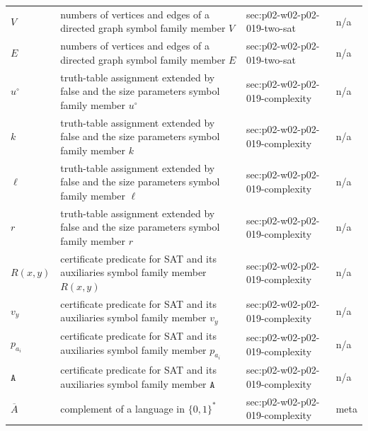 \begin{longtable}{@{}p{}p{}p{}p{}@{}}
\(V\) & numbers of vertices and edges of a directed graph symbol family member \(V\) & sec:\allowbreak{}p02-\allowbreak{}w02-\allowbreak{}p02-\allowbreak{}019-\allowbreak{}two-\allowbreak{}sat & n/a \\
\(E\) & numbers of vertices and edges of a directed graph symbol family member \(E\) & sec:\allowbreak{}p02-\allowbreak{}w02-\allowbreak{}p02-\allowbreak{}019-\allowbreak{}two-\allowbreak{}sat & n/a \\
\(u^{\circ}\) & truth-table assignment extended by false and the size parameters symbol family member \(u^{\circ}\) & sec:\allowbreak{}p02-\allowbreak{}w02-\allowbreak{}p02-\allowbreak{}019-\allowbreak{}complexity & n/a \\
\(k\) & truth-table assignment extended by false and the size parameters symbol family member \(k\) & sec:\allowbreak{}p02-\allowbreak{}w02-\allowbreak{}p02-\allowbreak{}019-\allowbreak{}complexity & n/a \\
\(\ell\) & truth-table assignment extended by false and the size parameters symbol family member \(\ell\) & sec:\allowbreak{}p02-\allowbreak{}w02-\allowbreak{}p02-\allowbreak{}019-\allowbreak{}complexity & n/a \\
\(r\) & truth-table assignment extended by false and the size parameters symbol family member \(r\) & sec:\allowbreak{}p02-\allowbreak{}w02-\allowbreak{}p02-\allowbreak{}019-\allowbreak{}complexity & n/a \\
\(R(x,\allowbreak y)\) & certificate predicate for SAT and its auxiliaries symbol family member \(R(x,y)\) & sec:\allowbreak{}p02-\allowbreak{}w02-\allowbreak{}p02-\allowbreak{}019-\allowbreak{}complexity & n/a \\
\(v_y\) & certificate predicate for SAT and its auxiliaries symbol family member \(v_y\) & sec:\allowbreak{}p02-\allowbreak{}w02-\allowbreak{}p02-\allowbreak{}019-\allowbreak{}complexity & n/a \\
\(p_{a_i}\) & certificate predicate for SAT and its auxiliaries symbol family member \(p_{a_i}\) & sec:\allowbreak{}p02-\allowbreak{}w02-\allowbreak{}p02-\allowbreak{}019-\allowbreak{}complexity & n/a \\
\(\mathtt A\) & certificate predicate for SAT and its auxiliaries symbol family member \(\mathtt A\) & sec:\allowbreak{}p02-\allowbreak{}w02-\allowbreak{}p02-\allowbreak{}019-\allowbreak{}complexity & n/a \\
\(\overline A\) & complement of a language in \(\{0,1\}^*\) & sec:\allowbreak{}p02-\allowbreak{}w02-\allowbreak{}p02-\allowbreak{}019-\allowbreak{}complexity & meta \\

\end{longtable}
